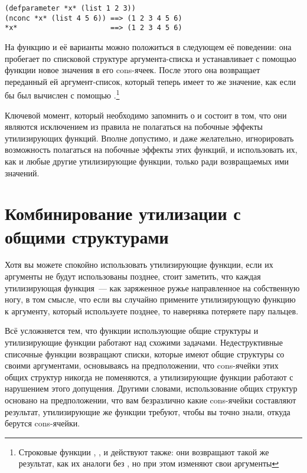 \begin{lstlisting}
(defparameter *x* (list 1 2 3))
(nconc *x* (list 4 5 6)) ==> (1 2 3 4 5 6)
*x*                      ==> (1 2 3 4 5 6)
\end{lstlisting}

На функцию  и её варианты можно положиться в следующем её поведении: она
пробегает по списковой структуре аргумента-списка и устанавливает с помощью функции
 новое значения в  его cons-ячеек. После этого она возвращает
переданный ей аргумент-список, который теперь имеет то же значение, как если бы был
вычислен с помощью .\footnote{Строковые функции
  , , и  действуют
  также: они возвращают такой же результат, как их аналоги без , но при этом
  изменяют свои аргументы}

Ключевой момент, который необходимо запомнить о  и  состоит
в том, что они являются исключением из правила не полагаться на побочные эффекты
утилизирующих функций. Вполне допустимо, и даже желательно, игнорировать возможность
полагаться на побочные эффекты этих функций, и использовать их, как и любые другие
утилизирующие функции, только ради возвращаемых ими значений.

\section{Комбинирование утилизации с общими структурами}

Хотя вы можете спокойно использовать утилизирующие функции, если их аргументы не будут
использованы позднее, стоит заметить, что каждая утилизирующая функция~--- как заряженное
ружье направленное на собственную ногу, в том смысле, что если вы случайно примените
утилизирующую функцию к аргументу, который используете позднее, то наверняка потеряете
пару пальцев.

Всё усложняется тем, что функции использующие общие структуры и утилизирующие функции
работают над схожими задачами. Недеструктивные списочные функции возвращают списки,
которые имеют общие структуры со своими аргументами, основываясь на предположении, что
cons-ячейки этих общих структур никогда не поменяются, а утилизирующие функции работают с
нарушением этого допущения. Другими словами, использование общих структур основано на
предположении, что вам безразлично какие cons-ячейки составляют результат, утилизирующие
же функции требуют, чтобы вы точно знали, откуда берутся cons-ячейки.

